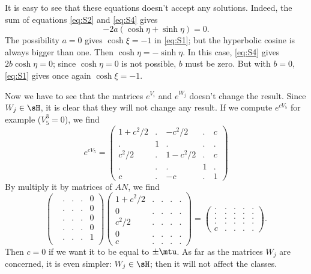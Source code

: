 It is easy to see that these equations doesn't accept any solutions. Indeed, the sum of equations \eqref{eq:S2} and \eqref{eq:S4} gives
\[
   -2a(\cosh\eta+\sinh\eta)=0.
\]
The possibility $a=0$ gives $\cosh\xi=-1$ in \eqref{eq:S1}; but the hyperbolic cosine is always bigger than one. Then $\cosh\eta=-\sinh\eta$. In this case, \eqref{eq:S4} gives $2b\cosh\eta=0$; since $\cosh\eta=0$ is not possible, $b$ must be zero. But with $b=0$, \eqref{eq:S1} gives once again $\cosh\xi=-1$.

Now we have to see that the matrices $e^{V_i}$ and $e^{W_j}$ doesn't change the result\label{pg:influence_V_W}. Since $W_j\in\sH$, it is clear that they will not change any result. If we compute $e^{cV_5}$ for example ($V_5^3=0$), we find
\begin{equation}		\label{EqExpDeV}
   e^{cV_5}=
\begin{pmatrix}
1+c^2/2	&		.	&	 -c^2/2	&	.	&	c\\
.		&	1	&	.	&	.	&	.\\
c^2/2		&	.	&	1-c^2/2	&	.	&	c\\
.		&	.	&	.	&	1	&	.\\
c		&	.	&	-c	&	.	&	1
\end{pmatrix}
\end{equation}
By multiply it by matrices of $AN$, we find
\[
\begin{pmatrix}
 &.&.&.&0\\
 &.&.&.&0\\
 &.&.&.&0\\
 &.&.&.&0\\
 &.&.&.&1\\ 
\end{pmatrix}
\begin{pmatrix}
 1+c^2/2&.&.&.&.\\
 0&.&.&.&.\\
 c^2/2&.&.&.&.\\
 0&.&.&.&.\\
 c&.&.&.&.
\end{pmatrix}
=
\begin{pmatrix}
 .&.&.&.&.\\
 .&.&.&.&.\\
 .&.&.&.&.\\
 .&.&.&.&.\\
 c&.&.&.&.
\end{pmatrix}.
\]
Then $c=0$ if we want it to be equal to $\pm\mtu$. As far as the matrices $W_j$ are concerned, it is even simpler: $W_j\in\sH$; then it will not affect the classes.

